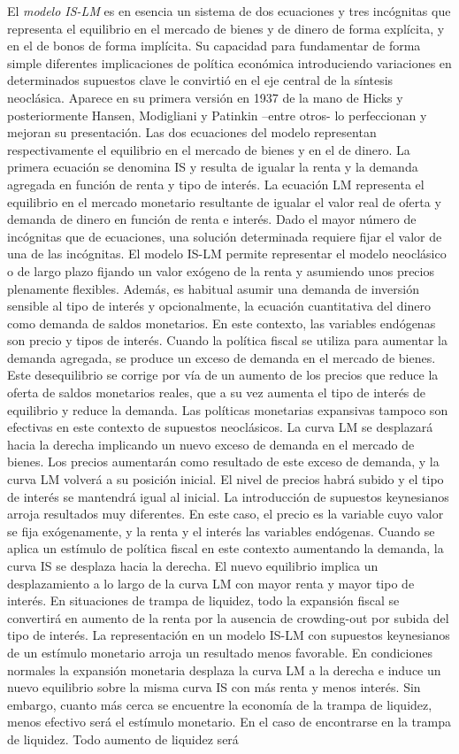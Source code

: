 \documentclass{nuevotema}
\begin{document}
El \textit{modelo IS-LM} es en esencia un sistema de dos ecuaciones y tres incógnitas que representa el equilibrio en el mercado de bienes y de dinero de forma explícita, y en el de bonos de forma implícita. Su capacidad para fundamentar de forma simple diferentes implicaciones de política económica introduciendo variaciones en determinados supuestos clave le convirtió en el eje central de la síntesis neoclásica. Aparece en su primera versión en 1937 de la mano de Hicks y posteriormente Hansen, Modigliani y Patinkin --entre otros- lo perfeccionan y mejoran su presentación. Las dos ecuaciones del modelo representan respectivamente el equilibrio en el mercado de bienes y en el de dinero. La primera ecuación se denomina IS y resulta de igualar la renta y la demanda agregada en función de renta y tipo de interés. La ecuación LM representa el equilibrio en el mercado monetario resultante de igualar el valor real de oferta y demanda de dinero en función de renta e interés. Dado el mayor número de incógnitas que de ecuaciones, una solución determinada requiere fijar el valor de una de las incógnitas. El modelo IS-LM permite representar el modelo neoclásico o de largo plazo fijando un valor exógeno de la renta y asumiendo unos precios plenamente flexibles. Además, es habitual asumir una demanda de inversión sensible al tipo de interés y opcionalmente, la ecuación cuantitativa del dinero como demanda de saldos monetarios. En este contexto, las variables endógenas son precio y tipos de interés. Cuando la política fiscal se utiliza para aumentar la demanda agregada, se produce un exceso de demanda en el mercado de bienes. Este desequilibrio se corrige por vía de un aumento de los precios que reduce la oferta de saldos monetarios reales, que a su vez aumenta el tipo de interés de equilibrio y reduce la demanda. Las políticas monetarias expansivas tampoco son efectivas en este contexto de supuestos neoclásicos. La curva LM se desplazará hacia la derecha implicando un nuevo exceso de demanda en el mercado de bienes. Los precios aumentarán como resultado de este exceso de demanda, y la curva LM volverá a su posición inicial. El nivel de precios habrá subido y el tipo de interés se mantendrá igual al inicial. La introducción de supuestos keynesianos arroja resultados muy diferentes. En este caso, el precio es la variable cuyo valor se fija exógenamente, y la renta y el interés las variables endógenas. Cuando se aplica un estímulo de política fiscal en este contexto aumentando la demanda, la curva IS se desplaza hacia la derecha. El nuevo equilibrio implica un desplazamiento a lo largo de la curva LM con mayor renta y mayor tipo de interés. En situaciones de trampa de liquidez, todo la expansión fiscal se convertirá en aumento de la renta por la ausencia de crowding-out por subida del tipo de interés. La representación en un modelo IS-LM con supuestos keynesianos de un estímulo monetario arroja un resultado menos favorable. En condiciones normales la expansión monetaria desplaza la curva LM a la derecha e induce un nuevo equilibrio sobre la misma curva IS con más renta y menos interés. Sin embargo, cuanto más cerca se encuentre la economía de la trampa de liquidez, menos efectivo será el estímulo monetario. En el caso de encontrarse en la trampa de liquidez. Todo aumento de liquidez será 
\end{document}
